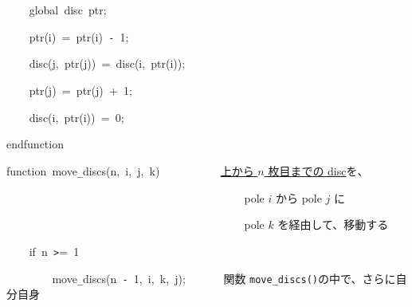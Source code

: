\documentclass[a4paper,10pt]{article}
\def\mc{\relax}
\begin{document}
\noindent
\mbox{}{\tt\mc \ }{\tt\mc \ }{\tt\mc \ }{\tt\mc \ }global{\tt\mc \ }disc{\tt\mc \ }ptr;

\noindent
\mbox{}{\tt\mc \ }{\tt\mc \ }{\tt\mc \ }{\tt\mc \ }ptr(i){\tt\mc \ }={\tt\mc \ }ptr(i){\tt\mc \ }{\tt -}{\tt\mc \ }1;

\noindent
\mbox{}{\tt\mc \ }{\tt\mc \ }{\tt\mc \ }{\tt\mc \ }disc(j,{\tt\mc \ }ptr(j)){\tt\mc \ }={\tt\mc \ }disc(i,{\tt\mc \ }ptr(i));

\noindent
\mbox{}{\tt\mc \ }{\tt\mc \ }{\tt\mc \ }{\tt\mc \ }ptr(j){\tt\mc \ }={\tt\mc \ }ptr(j){\tt\mc \ }+{\tt\mc \ }1;

\noindent
\mbox{}{\tt\mc \ }{\tt\mc \ }{\tt\mc \ }{\tt\mc \ }disc(i,{\tt\mc \ }ptr(i)){\tt\mc \ }={\tt\mc \ }0;

\noindent
\mbox{}endfunction

\noindent
\mbox{}\hfill

\noindent
\mbox{}function{\tt\mc \ }move{\tt\_}discs(n,{\tt\mc \ }i,{\tt\mc \ }j,{\tt\mc \ }k){\tt\mc \ }{\tt\mc \ }{\tt\mc \ }{\tt\mc \ }{\tt\mc \ }{\tt\mc \ }{\tt\mc \ }{\tt\mc \ }{\tt\mc \ }\rm\mc {\tt\%} \ \underline{\textsf{上から $n$ 枚目までの disc}}を、\hfill
\tt\mc 

\noindent
\mbox{}{\tt\mc \ }{\tt\mc \ }{\tt\mc \ }{\tt\mc \ }{\tt\mc \ }{\tt\mc \ }{\tt\mc \ }{\tt\mc \ }{\tt\mc \ }{\tt\mc \ }{\tt\mc \ }{\tt\mc \ }{\tt\mc \ }{\tt\mc \ }{\tt\mc \ }{\tt\mc \ }{\tt\mc \ }{\tt\mc \ }{\tt\mc \ }{\tt\mc \ }{\tt\mc \ }{\tt\mc \ }{\tt\mc \ }{\tt\mc \ }{\tt\mc \ }{\tt\mc \ }{\tt\mc \ }{\tt\mc \ }{\tt\mc \ }{\tt\mc \ }{\tt\mc \ }{\tt\mc \ }{\tt\mc \ }{\tt\mc \ }{\tt\mc \ }{\tt\mc \ }{\tt\mc \ }{\tt\mc \ }{\tt\mc \ }{\tt\mc \ }\rm\mc {\tt\%} \ pole $i$ から pole $j$ に\hfill
\tt\mc 

\noindent
\mbox{}{\tt\mc \ }{\tt\mc \ }{\tt\mc \ }{\tt\mc \ }{\tt\mc \ }{\tt\mc \ }{\tt\mc \ }{\tt\mc \ }{\tt\mc \ }{\tt\mc \ }{\tt\mc \ }{\tt\mc \ }{\tt\mc \ }{\tt\mc \ }{\tt\mc \ }{\tt\mc \ }{\tt\mc \ }{\tt\mc \ }{\tt\mc \ }{\tt\mc \ }{\tt\mc \ }{\tt\mc \ }{\tt\mc \ }{\tt\mc \ }{\tt\mc \ }{\tt\mc \ }{\tt\mc \ }{\tt\mc \ }{\tt\mc \ }{\tt\mc \ }{\tt\mc \ }{\tt\mc \ }{\tt\mc \ }{\tt\mc \ }{\tt\mc \ }{\tt\mc \ }{\tt\mc \ }{\tt\mc \ }{\tt\mc \ }{\tt\mc \ }\rm\mc {\tt\%} \ pole $k$ を経由して、移動する\hfill
\tt\mc 

\noindent
\mbox{}{\tt\mc \ }{\tt\mc \ }{\tt\mc \ }{\tt\mc \ }if{\tt\mc \ }n{\tt\mc \ }{\tt >}={\tt\mc \ }1

\noindent
\mbox{}{\tt\mc \ }{\tt\mc \ }{\tt\mc \ }{\tt\mc \ }{\tt\mc \ }{\tt\mc \ }{\tt\mc \ }{\tt\mc \ }move{\tt\_}discs(n{\tt\mc \ }{\tt -}{\tt\mc \ }1,{\tt\mc \ }i,{\tt\mc \ }k,{\tt\mc \ }j);{\tt\mc \ }{\tt\mc \ }{\tt\mc \ }{\tt\mc \ }{\tt\mc \ }\rm\mc {\tt\%} \ 関数 {\tt move\_discs()}の中で、さらに自分自身 \hfill
\tt\mc 
\end{document}
